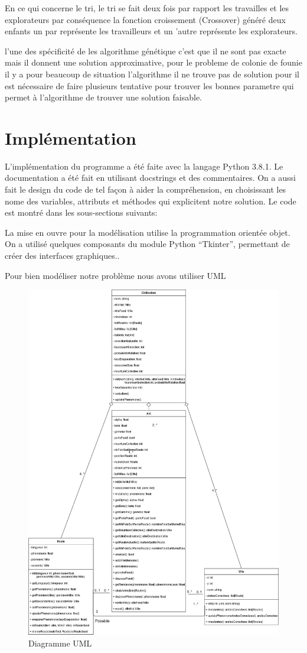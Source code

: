 \documentclass{rapportECL}
\begin{document}
En ce qui concerne le tri, le tri se fait deux fois par rapport les travailles et les explorateurs par conséquence la fonction croissement (Crossover) généré deux enfants un par représente les travailleurs et un ’autre représente les explorateurs.

\newpage
l'une des spécificité de les algorithme génétique c'est que il ne sont pas exacte mais il donnent une solution approximative, pour le probleme de colonie de founie il y a pour beaucoup de situation l'algorithme il ne trouve pas de solution pour il est nécessaire de faire plusieurs tentative pour trouver les bonnes parametre qui permet à l'algorithme de trouver une solution faisable.


\section{Implémentation}

L'implémentation du programme a été faite avec la langage Python 3.8.1. Le documentation a été fait en utilisant docstrings et des commentaires. On a aussi fait le design du code de tel façon  à aider la compréhension, en choisissant les nome des variables, attributs et méthodes qui explicitent notre solution. Le code est montré dans les sous-sections suivants:

La mise en ouvre pour la modélisation utilise la programmation orientée objet. On a utilisé quelques composants du module  Python “Tkinter”, permettant de créer des interfaces graphiques.. 

Pour bien modéliser notre problème nous avons utiliser UML

 \begin{figure}[H]
    \centering
    \includegraphics[width=0.8\linewidth]{UML-Civilisation-Fourmi-Route-Ville-UML.jpg}
    \caption{  Diagramme UML  }
    \label{Dim}
\end{figure}\\
\end{document}
